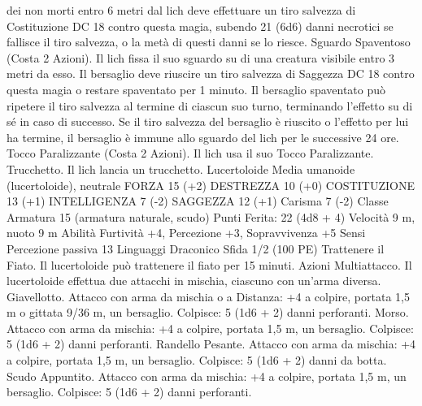\begin{multicols}{2}
dei non morti entro 6 metri dal lich deve effettuare un tiro
salvezza di Costituzione DC 18 contro questa magia, subendo 21
(6d6) danni necrotici se fallisce il tiro salvezza, o la metà di
questi danni se lo riesce.
Sguardo Spaventoso (Costa 2 Azioni). Il lich fissa il suo sguardo
su di una creatura visibile entro 3 metri da esso. Il bersaglio deve
riuscire un tiro salvezza di Saggezza DC 18 contro questa magia
o restare spaventato per 1 minuto. Il bersaglio spaventato può
ripetere il tiro salvezza al termine di ciascun suo turno,
terminando l’effetto su di sé in caso di successo. Se il tiro
salvezza del bersaglio è riuscito o l’effetto per lui ha termine, il
bersaglio è immune allo sguardo del lich per le successive 24
ore.
Tocco Paralizzante (Costa 2 Azioni). Il lich usa il suo Tocco
Paralizzante.
Trucchetto. Il lich lancia un trucchetto.
Lucertoloide
Media umanoide (lucertoloide), neutrale
FORZA 15 (+2)
DESTREZZA 10 (+0)
COSTITUZIONE 13 (+1)
INTELLIGENZA 7 (-2)
SAGGEZZA 12 (+1)
Carisma 7 (-2)
Classe Armatura 15 (armatura naturale, scudo)
\hspace*{0pt}\hfill{Punti Ferita}: 22 (4d8 + 4)
Velocità 9 m, nuoto 9 m
Abilità Furtività +4, Percezione +3, Sopravvivenza +5
Sensi Percezione passiva 13
Linguaggi Draconico
Sfida 1/2 (100 PE)
Trattenere il Fiato. Il lucertoloide può trattenere il fiato per 15
minuti.
Azioni
Multiattacco. Il lucertoloide effettua due attacchi in mischia,
ciascuno con un’arma diversa.
Giavellotto. Attacco con arma da mischia o a Distanza: +4 a
colpire, portata 1,5 m o gittata 9/36 m, un bersaglio.
Colpisce: 5 (1d6 + 2) danni perforanti.
Morso. Attacco con arma da mischia: +4 a colpire, portata 1,5
m, un bersaglio.
Colpisce: 5 (1d6 + 2) danni perforanti.
Randello Pesante. Attacco con arma da mischia: +4 a colpire,
portata 1,5 m, un bersaglio.
Colpisce: 5 (1d6 + 2) danni da botta.
Scudo Appuntito. Attacco con arma da mischia: +4 a colpire,
portata 1,5 m, un bersaglio.
Colpisce: 5 (1d6 + 2) danni perforanti.
 

\end{multicols}
